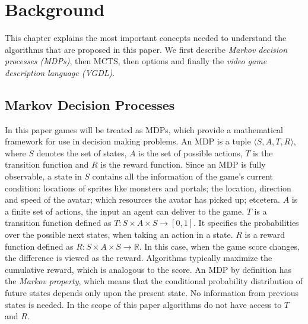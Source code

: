 \section{Background}
\label{sec:background}

This chapter explains the most important concepts needed to understand the
algorithms that are proposed in this paper. We first describe \emph{Markov
decision processes (MDPs)}, then  MCTS, then options and finally the \emph{video
game description language (VGDL)}.

\subsection{Markov Decision Processes}
\label{subsec:mdps}
In this paper games will be treated as MDPs, which provide a mathematical
framework for use in decision making problems. An MDP is a 
tuple $\langle S, A, T, R \rangle$, where $S$ denotes the set of states, $A$ is
the set of possible actions, $T$ is the transition function and $R$ is the
reward function. Since an MDP is fully observable, a state in $S$ contains all
the information of the game's current condition: locations of sprites like
monsters and portals; the location, direction and speed of the avatar; which
resources the avatar has picked up; etcetera. $A$ is a finite set of actions,
the input an agent can deliver to the game. $T$ is a transition function defined
as $T : S \times A \times S \rightarrow \left[0,1\right]$. It specifies the
probabilities over the possible next states, when taking an action in a state.
$R$ is a reward function defined as $R: S \times A \times S \rightarrow
\mathbb{R}$. In this case, when the game score changes, the difference is viewed
as the reward.  Algorithms typically maximize the cumulative reward, which is
analogous to the score. An MDP by definition has the \emph{Markov property},
which means that the conditional probability distribution of future states
depends only upon the present state. No information from previous states is
needed. In the scope of this paper algorithms do not have access to $T$ and
$R$.

